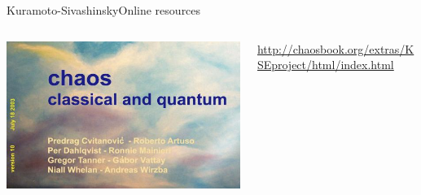 \documentclass[usenames,dvipsnames,svgnames,10pt,aspectratio=169]{beamer}
\begin{document}
\begin{frame}[t, c]{Kuramoto-Sivashinsky}{Online resources}
	  \begin{minipage}{.9\textwidth}
			\begin{columns}
				\begin{column}{.2\textwidth}
					\centering
					\includegraphics[height=.15\textheight]{chaosbook}
				\end{column}
				\begin{column}{.7\textwidth}
					\url{http://chaosbook.org/extras/KSEproject/html/index.html}
				\end{column}
			\end{columns}
		\end{minipage}
\end{frame}
\end{document}

